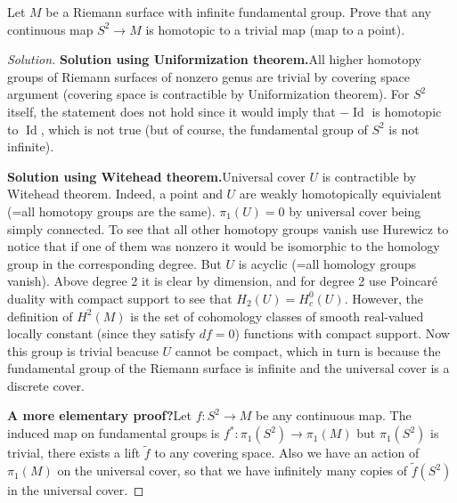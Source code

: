 \begin{manualexercise}{5.2}
	Let $M$ be a Riemann surface with infinite fundamental group. Prove that any continuous map $S^{2}\to M$ is homotopic to a trivial map (map to a point).
\end{manualexercise}

\begin{proof}[Solution]

	{\color{4}\bfseries Solution using Uniformization theorem.}\hspace{.5em}All higher homotopy groups of Riemann surfaces of nonzero genus are trivial by covering space argument (covering space is contractible by Uniformization theorem). For $S^{2}$ itself, the statement does not hold since it would imply that $-\operatorname{Id}$ is homotopic to $\operatorname{Id}$, which is not true (but of course, the fundamental group of $S^2$ is not infinite).

	{\color{4}\bfseries Solution using Witehead theorem.}\hspace{.5em}Universal cover $U$ is contractible by Witehead theorem. Indeed, a point and $U$ are weakly homotopically equivialent (=all homotopy groups are the same). $\pi_{1}(U) =0$ by universal cover being simply connected. To see that all other homotopy groups vanish use Hurewicz to notice that if one of them was nonzero it would be isomorphic to the homology group in the corresponding degree. But  $U$ is acyclic (=all homology groups vanish). Above degree 2 it is clear by dimension, and for degree 2 use Poincaré duality with compact support to see that $H_2(U)=H^{0}_c(U)$. However, the definition of $H^{2}(M)$ is the set of cohomology classes of smooth real-valued locally constant (since they satisfy $df=0$) functions with compact support. Now this group is trivial beacuse $U$ cannot be compact, which in turn is because the fundamental group of the Riemann surface is infinite and the universal cover is a discrete cover.

{\color{4}\bfseries A more elementary proof?}\hspace{.5em}Let $f:S^2\longrightarrow M$ be any continuous map. The induced map on fundamental groups is $f^* :\pi_{1}(S^2) \longrightarrow \pi_{1}(M)$ but $\pi_{1}(S^2)$ is trivial, there exists a lift $\tilde{f}$ to any covering space. Also we have an action of $\pi_{1}(M)$ on the universal cover, so that we have infinitely many copies of $\tilde{f}(S^2)$ in the universal cover.

\end{proof}


